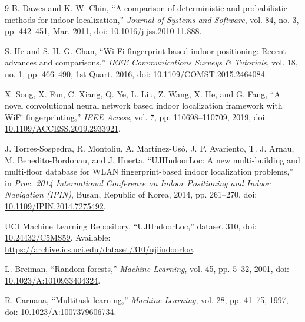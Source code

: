 \documentclass[conference]{IEEEtran}
\begin{document}
\small
\begin{thebibliography}{9}
B. Dawes and K.-W. Chin, ``A comparison of deterministic and probabilistic methods for indoor localization,'' \emph{Journal of Systems and Software}, vol. 84, no. 3, pp. 442--451, Mar. 2011, doi: \href{https://doi.org/10.1016/j.jss.2010.11.888}{10.1016/j.jss.2010.11.888}.

S. He and S.-H. G. Chan, ``Wi-Fi fingerprint-based indoor positioning: Recent advances and comparisons,'' \emph{IEEE Communications Surveys \& Tutorials}, vol. 18, no. 1, pp. 466--490, 1st Quart. 2016, doi: \href{https://doi.org/10.1109/COMST.2015.2464084}{10.1109/COMST.2015.2464084}.

X. Song, X. Fan, C. Xiang, Q. Ye, L. Liu, Z. Wang, X. He, and G. Fang, ``A novel convolutional neural network based indoor localization framework with WiFi fingerprinting,'' \emph{IEEE Access}, vol. 7, pp. 110698--110709, 2019, doi: \href{https://doi.org/10.1109/ACCESS.2019.2933921}{10.1109/ACCESS.2019.2933921}.

J. Torres-Sospedra, R. Montoliu, A. Mart\'{i}nez-Us\'{o}, J. P. Avariento, T. J. Arnau, M. Benedito-Bordonau, and J. Huerta,
``UJIIndoorLoc: A new multi-building and multi-floor database for WLAN fingerprint-based indoor localization problems,''
in \emph{Proc. 2014 International Conference on Indoor Positioning and Indoor Navigation (IPIN)}, Busan, Republic of Korea, 2014, pp. 261--270, doi: \href{https://doi.org/10.1109/IPIN.2014.7275492}{10.1109/IPIN.2014.7275492}.

UCI Machine Learning Repository, ``UJIIndoorLoc,'' dataset 310, doi: \href{https://doi.org/10.24432/C5MS59}{10.24432/C5MS59}. Available: \url{https://archive.ics.uci.edu/dataset/310/ujiindoorloc}.

L. Breiman, ``Random forests,'' \emph{Machine Learning}, vol. 45, pp. 5--32, 2001, doi: \href{https://doi.org/10.1023/A:1010933404324}{10.1023/A:1010933404324}.

R. Caruana, ``Multitask learning,'' \emph{Machine Learning}, vol. 28, pp. 41--75, 1997, doi: \href{https://doi.org/10.1023/A:1007379606734}{10.1023/A:1007379606734}.
\end{thebibliography}
\end{document}

